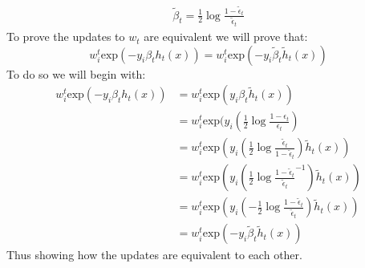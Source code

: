 \documentclass{article}
\begin{document}
\begin{titlepage}
\begin{align*}
\widetilde{\beta}_t = \frac{1}{2} \log \frac{1-\widetilde{\epsilon}_t}{\widetilde{\epsilon}_t}
\end{align*}
To prove the updates to $w_t$ are equivalent we will prove that:
\[ w^t_i \text{exp}(-y_i\beta_th_t(x)) = w^t_i \text{exp}(-y_i\widetilde{\beta}_t\widetilde{h}_t(x)) \]
To do so we will begin with:
\begin{align*}
w^t_i \text{exp}(-y_i\beta_th_t(x)) &= w^t_i \text{exp}(y_i\beta_t\widetilde{h}_t(x)) \\
&= w^t_i \text{exp}(y_i( \frac{1}{2} \log \frac{1-\epsilon_t}{\epsilon_t} ) \\
&= w^t_i \text{exp}(y_i( \frac{1}{2} \log \frac{\widetilde{\epsilon}_t}{1- \widetilde{\epsilon}_t} ) \widetilde{h}_t(x)) \\
&= w^t_i \text{exp}(y_i( \frac{1}{2} \log \frac{1- \widetilde{\epsilon}_t}{\widetilde{\epsilon}_t}^{-1} ) \widetilde{h}_t(x))  \\
&= w^t_i \text{exp}(y_i( - \frac{1}{2} \log \frac{1- \widetilde{\epsilon}_t}{\widetilde{\epsilon}_t} ) \widetilde{h}_t(x)) \\
&= w^t_i \text{exp}(- y_i\widetilde{\beta}_t \widetilde{h}_t(x)) 
\end{align*}
Thus showing how the updates are equivalent to each other.


\end{titlepage}
\end{document}
